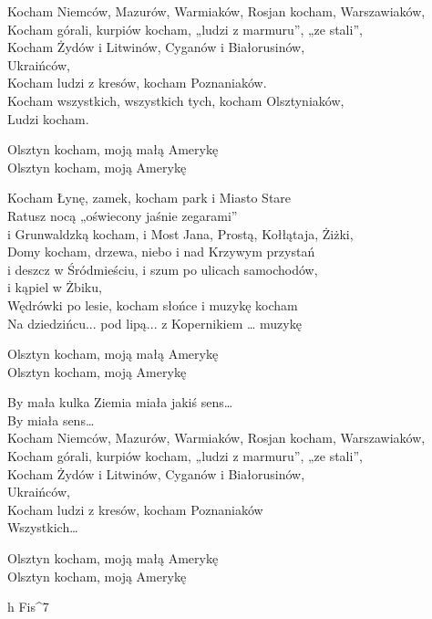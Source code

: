 \begin{text}
    \footnotesize{
    Kocham Niemców, Mazurów, Warmiaków, Rosjan kocham, Warszawiaków,\\
    Kocham górali, kurpiów kocham, „ludzi z marmuru”, „ze stali”,\\
    Kocham Żydów i Litwinów, Cyganów i Białorusinów,\\
    Ukraińców,\\
    Kocham ludzi z kresów, kocham Poznaniaków.\\
    Kocham wszystkich, wszystkich tych, kocham Olsztyniaków,\\
    Ludzi kocham.

    Olsztyn kocham, moją małą Amerykę\\
    Olsztyn kocham, moją Amerykę

    Kocham Łynę, zamek, kocham park i Miasto Stare\\
    Ratusz nocą „oświecony jaśnie zegarami”\\
    i Grunwaldzką kocham, i Most Jana, Prostą, Kołłątaja, Żiżki,\\
    Domy kocham, drzewa, niebo i nad Krzywym przystań\\
    i deszcz w Śródmieściu, i szum po ulicach samochodów,\\
    i kąpiel w Żbiku,\\
    Wędrówki po lesie, kocham słońce i muzykę kocham\\
    Na dziedzińcu... pod lipą... z Kopernikiem … muzykę

    Olsztyn kocham, moją małą Amerykę\\
    Olsztyn kocham, moją Amerykę

    By mała kulka Ziemia miała jakiś sens…\\
    By miała sens…\\
    Kocham Niemców, Mazurów, Warmiaków, Rosjan kocham, Warszawiaków,\\
    Kocham górali, kurpiów kocham, „ludzi z marmuru”, „ze stali”,\\
    Kocham Żydów i Litwinów, Cyganów i Białorusinów,\\
    Ukraińców,\\
    Kocham ludzi z kresów, kocham Poznaniaków\\
    Wszystkich…

    Olsztyn kocham, moją małą Amerykę\\
    Olsztyn kocham, moją Amerykę
    }
\end{text}
\begin{chord}
    \footnotesize{
    h Fis^7
    }
\end{chord}